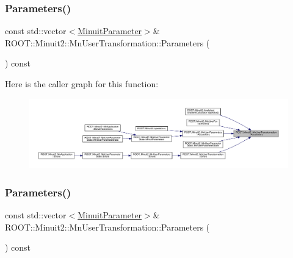 \subsubsection{\texorpdfstring{Parameters()}{Parameters()}\hspace{0.1cm}{\footnotesize\ttfamily [1/2]}}
{\footnotesize\ttfamily const std\+::vector$<$\mbox{\hyperlink{classROOT_1_1Minuit2_1_1MinuitParameter}{Minuit\+Parameter}}$>$\& R\+O\+O\+T\+::\+Minuit2\+::\+Mn\+User\+Transformation\+::\+Parameters (\begin{DoxyParamCaption}{ }\end{DoxyParamCaption}) const\hspace{0.3cm}{\ttfamily [inline]}}

Here is the caller graph for this function\+:\nopagebreak
\begin{figure}[H]
\begin{center}
\leavevmode
\includegraphics[width=350pt]{d9/d98/classROOT_1_1Minuit2_1_1MnUserTransformation_a29366e4f3594d0cf3b5d4dc0b1597ad6_icgraph}
\end{center}
\end{figure}
\mbox{\label{classROOT_1_1Minuit2_1_1MnUserTransformation_a29366e4f3594d0cf3b5d4dc0b1597ad6}} 
\subsubsection{\texorpdfstring{Parameters()}{Parameters()}\hspace{0.1cm}{\footnotesize\ttfamily [2/2]}}
{\footnotesize\ttfamily const std\+::vector$<$\mbox{\hyperlink{classROOT_1_1Minuit2_1_1MinuitParameter}{Minuit\+Parameter}}$>$\& R\+O\+O\+T\+::\+Minuit2\+::\+Mn\+User\+Transformation\+::\+Parameters (\begin{DoxyParamCaption}{ }\end{DoxyParamCaption}) const\hspace{0.3cm}{\ttfamily [inline]}}

